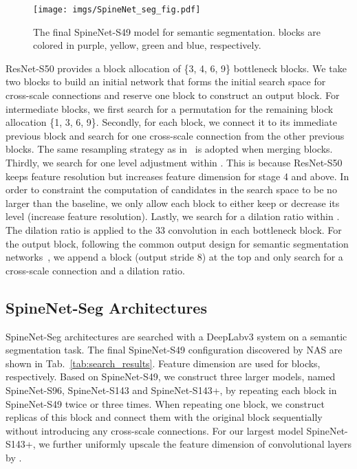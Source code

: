 \documentclass[10pt,twocolumn,letterpaper]{article}
\begin{document}
\begin{figure}[t!]
    \begin{center}
    \texttt{[image: imgs/SpineNet\_seg\_fig.pdf]}
    \end{center}
    \caption{The final SpineNet-S49 model for semantic segmentation.  blocks are colored in purple, yellow, green and blue, respectively.}
    \label{fig:architecture}
\end{figure}


ResNet-S50 provides a block allocation of \{3, 4, 6, 9\} bottleneck blocks. We take two  blocks to build an initial network that forms the initial search space for cross-scale connections and reserve one  block to construct an output block. For intermediate blocks, we first search for a permutation for the remaining block allocation \{1, 3, 6, 9\}. Secondly, for each block, we connect it to its immediate previous block and search for one cross-scale connection from the other previous blocks. The same resampling strategy as in~\cite{spinenet} is adopted when merging blocks. Thirdly, we search for one level adjustment within . This is because ResNet-S50 keeps feature resolution but increases feature dimension for stage 4 and above. In order to constraint the computation of candidates in the search space to be no larger than the baseline, we only allow each block to either keep or decrease its level (\ie increase feature resolution). Lastly, we search for a dilation ratio within . The dilation ratio is applied to the 33 convolution in each bottleneck block. For the output block, following the common output design for semantic segmentation networks~\cite{deeplabv3,deeplabv3plus,mobilenetv3}, we append a  block (\ie output stride 8) at the top and only search for a cross-scale connection and a dilation ratio.

\subsection{SpineNet-Seg Architectures}\label{sec:spinenet_seg_arc}
SpineNet-Seg architectures are searched with a DeepLabv3 system on a semantic segmentation task. The final SpineNet-S49 configuration discovered by NAS are shown in Tab.~\ref{tab:search_results}. Feature dimension  are used for  blocks, respectively. Based on SpineNet-S49, we construct three larger models, named SpineNet-S96, SpineNet-S143 and SpineNet-S143+, by repeating each block in SpineNet-S49 twice or three times. When repeating one block, we construct replicas of this block and connect them with the original block sequentially without introducing any cross-scale connections. For our largest model SpineNet-S143+, we further uniformly upscale the feature dimension of convolutional layers by .
\end{document}
